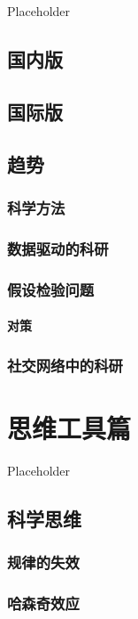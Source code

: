 \documentclass[]{book}
\begin{document}
Placeholder

\section{国内版}

\section{国际版}

\section{趋势}

\subsection{科学方法}

\subsection{数据驱动的科研}

\subsection{假设检验问题}

\subsubsection{对策}

\subsection{社交网络中的科研}

\chapter{思维工具篇}\label{thought}

Placeholder

\section{科学思维}

\subsection{规律的失效}

\subsection{哈森奇效应}
\end{document}
